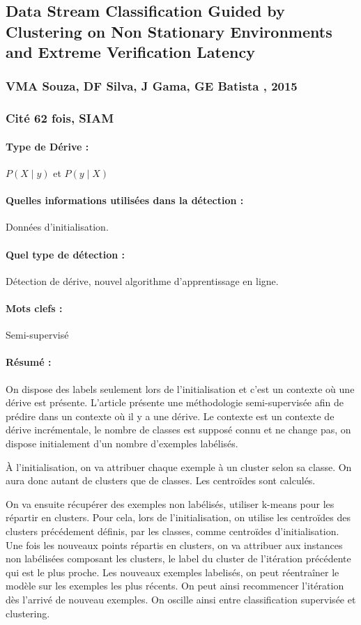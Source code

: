 \documentclass[11pt,a4paper]{report}
\begin{document}
\subsection{Data Stream Classification Guided by Clustering on Non Stationary Environments and Extreme Verification Latency}
\subsubsection{VMA Souza, DF Silva, J Gama, GE Batista , 2015}
\subsubsection{Cité 62 fois, SIAM}

\paragraph{Type de Dérive :} $P(X\mid y)$ et $P(y \mid X)$
\paragraph{Quelles informations utilisées dans la détection :} Données d'initialisation.
\paragraph{Quel type de détection :} Détection de dérive, nouvel algorithme d'apprentissage en ligne.
\paragraph{Mots clefs :} Semi-supervisé

\paragraph{Résumé :} On dispose des labels seulement lors de l'initialisation et c'est un contexte où une dérive est présente.
L'article présente une méthodologie semi-supervisée afin de prédire dans un contexte où il y a une dérive. Le contexte est un contexte de dérive incrémentale, le nombre de classes est supposé connu et ne change pas, on dispose initialement d'un nombre d'exemples labélisés.

 À l'initialisation, on va attribuer chaque exemple à un cluster selon sa classe. On aura donc autant de clusters que de classes. Les centroïdes sont calculés.
 
 On va ensuite récupérer des exemples non labélisés, utiliser k-means pour les répartir en clusters. Pour cela, lors de l'initialisation, on utilise les centroïdes des clusters précédement définis, par les classes, comme centroïdes d'initialisation. Une fois les nouveaux points répartis en clusters, on va attribuer aux instances non labélisées composant les clusters, le label du cluster de l'itération précédente qui est le plus proche. Les nouveaux exemples labelisés, on peut réentraîner le modèle sur les exemples les plus récents. 
On peut ainsi recommencer l'itération dès l'arrivé de nouveau exemples. On oscille ainsi entre classification supervisée et clustering.
\end{document}
